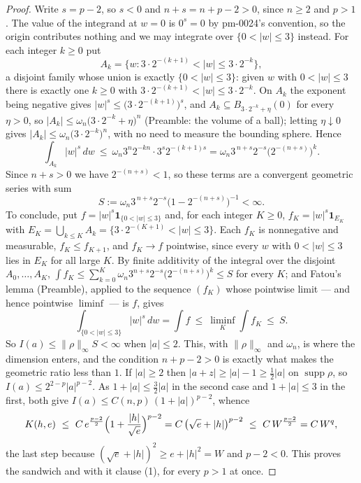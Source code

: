 \begin{proof}
Write $s=p-2$, so $s<0$ and $n+s=n+p-2>0$, since $n\ge2$ and $p>1$.  The value
of the integrand at $w=0$ is $0^{s}=0$ by pm-0024's convention, so the origin
contributes nothing and we may integrate over $\{0<|w|\le3\}$ instead.  For each
integer $k\ge0$ put
\[
A_k=\bigl\{w:3\cdot2^{-(k+1)}<|w|\le3\cdot2^{-k}\bigr\} ,
\]
a disjoint family whose union is exactly $\{0<|w|\le3\}$: given $w$ with
$0<|w|\le3$ there is exactly one $k\ge0$ with
$3\cdot2^{-(k+1)}<|w|\le3\cdot2^{-k}$.  On $A_k$ the exponent being negative
gives $|w|^{s}\le\bigl(3\cdot2^{-(k+1)}\bigr)^{s}$, and
$A_k\subseteq B_{3\cdot2^{-k}+\eta}(0)$ for every $\eta>0$, so
$|A_k|\le\omega_n\bigl(3\cdot2^{-k}+\eta\bigr)^n$ (Preamble: the volume of a
ball); letting $\eta\downarrow0$ gives
$|A_k|\le\omega_n\bigl(3\cdot2^{-k}\bigr)^n$, with no need to measure the
bounding sphere.
Hence
\[
\int_{A_k}|w|^{s}\,dw
\ \le\ \omega_n3^{n}2^{-kn}\cdot3^{s}2^{-(k+1)s}
=\omega_n3^{\,n+s}2^{-s}\bigl(2^{-(n+s)}\bigr)^{k} .
\]
Since $n+s>0$ we have $2^{-(n+s)}<1$, so these terms are a convergent geometric
series with sum
\[
S:=\omega_n3^{\,n+s}2^{-s}\bigl(1-2^{-(n+s)}\bigr)^{-1}<\infty .
\]
To conclude, put $f=|w|^{s}\mathbf1_{\{0<|w|\le3\}}$ and, for each integer $K\ge0$,
$f_K=|w|^{s}\mathbf1_{E_K}$ with $E_K=\bigcup_{k\le K}A_k
=\{3\cdot2^{-(K+1)}<|w|\le3\}$.  Each $f_K$ is nonnegative and measurable,
$f_K\le f_{K+1}$, and $f_K\to f$ pointwise, since every $w$ with $0<|w|\le3$
lies in $E_K$ for all large $K$.  By finite additivity of the integral over the
disjoint $A_0,\dots,A_K$, $\int f_K\le\sum_{k=0}^{K}\omega_n3^{n+s}2^{-s}
\bigl(2^{-(n+s)}\bigr)^{k}\le S$ for every $K$; and Fatou's lemma (Preamble),
applied to the sequence $(f_K)$ whose pointwise limit --- and hence pointwise
$\liminf$ --- is $f$, gives
\[
\int_{\{0<|w|\le3\}}|w|^{s}\,dw=\int f\ \le\ \liminf_K\int f_K\ \le\ S .
\]
So $I(a)\le\|\rho\|_\infty S<\infty$ when $|a|\le2$.  This, with
$\|\rho\|_\infty$ and $\omega_n$, is where the dimension enters, and the
condition $n+p-2>0$ is exactly what makes the geometric ratio less than $1$.  If $|a|\ge2$ then $|a+z|\ge|a|-1\ge\tfrac12|a|$ on
$\operatorname{supp}\rho$, so $I(a)\le2^{2-p}|a|^{p-2}$.  As $1+|a|\le\tfrac32|a|$
in the second case and $1+|a|\le3$ in the first, both give
$I(a)\le C(n,p)\,(1+|a|)^{p-2}$, whence
\[
K(h,e)\ \le\ C\,e^{\frac{p-2}2}\Bigl(1+\frac{|h|}{\sqrt e}\Bigr)^{p-2}
=C\,\bigl(\sqrt e+|h|\bigr)^{p-2}\ \le\ C\,W^{\frac{p-2}2}=C\,W^q ,
\]
the last step because $(\sqrt e+|h|)^2\ge e+|h|^2=W$ and $p-2<0$.  This proves
the sandwich and with it clause (1), for every $p>1$ at once.


\end{proof}
